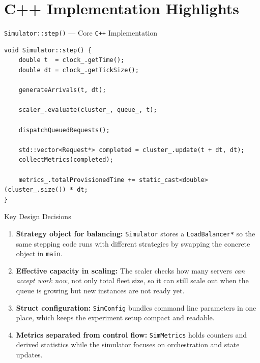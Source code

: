 \documentclass[12pt, a4paper]{article}
\newcommand{\cpp}{\texttt{C++}}
\newcommand{\code}[1]{\texttt{\textcolor{NUNavyL}{#1}}}
\begin{document}
\section{C++ Implementation Highlights}

\begin{codebox}{\texttt{Simulator::step()} — Core \cpp{} Implementation}
\begin{lstlisting}
void Simulator::step() {
    double t  = clock_.getTime();
    double dt = clock_.getTickSize();

    generateArrivals(t, dt);

    scaler_.evaluate(cluster_, queue_, t);

    dispatchQueuedRequests();

    std::vector<Request*> completed = cluster_.update(t + dt, dt);
    collectMetrics(completed);

    metrics_.totalProvisionedTime += static_cast<double>(cluster_.size()) * dt;
}
\end{lstlisting}
\end{codebox}

\begin{infocard}{\faCogs\enspace Key Design Decisions}
\begin{enumerate}[label=\textcolor{NURed}{\textbf{D\arabic*.}}, leftmargin=2em]
  \item \textbf{Strategy object for balancing:}
    \code{Simulator} stores a \code{LoadBalancer*} so the same stepping code runs
    with different strategies by swapping the concrete object in
    \texttt{main}.
  \item \textbf{Effective capacity in scaling:}
    The scaler checks how many servers \emph{can accept work now}, not only
    total fleet size, so it can still scale out when the queue is growing but
    new instances are not ready yet.
  \item \textbf{Struct configuration:}
    \code{SimConfig} bundles command line parameters in one place, which keeps
    the experiment setup compact and readable.
  \item \textbf{Metrics separated from control flow:}
    \code{SimMetrics} holds counters and derived statistics while the simulator
    focuses on orchestration and state updates.
\end{enumerate}
\end{infocard}
\end{document}
